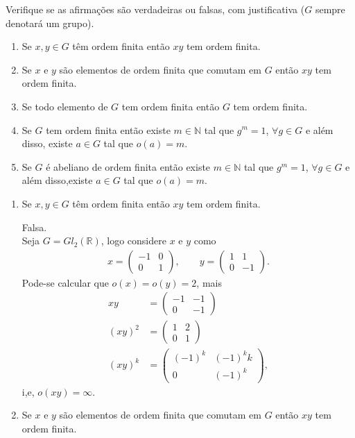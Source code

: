 \begin{homeworkProblem}
  Verifique se as afirmações são verdadeiras ou falsas, com justificativa ($G$ sempre denotará um grupo).
  \begin{enumerate}
    \item Se $x,y \in G$ têm ordem finita então $xy$ tem ordem finita.
    
    \item Se $x$ e $y$ são elementos de ordem finita que comutam em $G$ então $xy$ tem ordem finita.
    
    \item Se todo elemento de $G$ tem ordem finita então $G$ tem ordem finita.
    
    \item Se $G$ tem ordem finita então existe $m \in \mathbb{N}$ tal que $g^m = 1$, $\forall g \in G$ e além disso, existe $a \in G$ tal que $o(a)=m$.
    
    \item Se $G$ é abeliano de ordem finita então existe $m \in \mathbb{N}$ tal que $g^m = 1$, $\forall g \in G$ e além disso,existe $a \in G$ tal que $o(a)=m$.
  \end{enumerate}
  \begin{solution}
    \begin{enumerate}
      \item Se $x,y \in G$ têm ordem finita então $xy$ tem ordem finita.

        Falsa.\\
        Seja $G=Gl_2(\mathbb{R})$, logo considere $x$ e $y$ como  
        \begin{align*}
          x=\begin{pmatrix}
            -1 & 0 \\
            0 & 1
          \end{pmatrix},\qquad y=\begin{pmatrix}
            1 & 1 \\
            0 & -1
          \end{pmatrix}.
        \end{align*}
        Pode-se calcular que $o(x)=o(y)=2$, mais
        \begin{align*}
          xy&=\begin{pmatrix}
            -1 & -1 \\
            0 & -1
          \end{pmatrix}\\
          (xy)^2&=\begin{pmatrix}
            1 & 2 \\
            0& 1
          \end{pmatrix}\\
          (xy)^{k}&=\begin{pmatrix}
            (-1)^{k} & (-1)^{k}k \\
            0 & (-1)^{k}
          \end{pmatrix},
        \end{align*}
        i,e, $o(xy)=\infty$.
      \item Se $x$ e $y$ são elementos de ordem finita que comutam em $G$ então $xy$ tem ordem finita.


\end{enumerate}
\end{solution}
\end{homeworkProblem}
